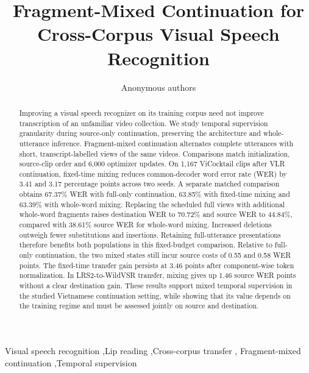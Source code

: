 \documentclass[preprint,review,12pt]{elsarticle}
\begin{document}
\begin{frontmatter}
\title{Fragment-Mixed Continuation for Cross-Corpus Visual Speech Recognition}
\author{Anonymous authors}
\begin{abstract}
Improving a visual speech recognizer on its training corpus need not improve
transcription of an unfamiliar video collection. We study temporal supervision
granularity during source-only continuation, preserving the architecture and
whole-utterance inference. Fragment-mixed continuation alternates complete
utterances with short, transcript-labelled views of the same videos. Comparisons
match initialization, source-clip order and 6,000 optimizer updates. On 1,167
ViCocktail clips after VLR continuation, fixed-time mixing reduces common-decoder
word error rate (WER) by 3.41 and 3.17 percentage points across two seeds.
A separate matched comparison obtains 67.37\% WER with full-only continuation,
63.85\% with fixed-time mixing and 63.39\% with whole-word mixing. Replacing the
scheduled full views with additional whole-word fragments raises destination
WER to 70.72\% and source WER to 44.84\%, compared with 38.61\% source WER for
whole-word mixing. Increased deletions outweigh fewer substitutions and insertions.
Retaining full-utterance presentations therefore benefits both populations in
this fixed-budget comparison. Relative to full-only continuation, the two mixed
states still incur source costs of 0.55 and 0.58 WER points. The fixed-time
transfer gain persists at 3.46 points after component-wise token normalization.
In LRS2-to-WildVSR transfer, mixing gives up 1.46 source WER points without a
clear destination gain. These results support mixed temporal supervision in
the studied Vietnamese continuation setting, while showing that its value depends
on the training regime and must be assessed jointly on source and destination.
\end{abstract}
\begin{keyword}
Visual speech recognition \sep Lip reading \sep Cross-corpus transfer \sep
Fragment-mixed continuation \sep Temporal supervision
\end{keyword}
\end{frontmatter}









\begingroup
{}

\endgroup
\end{document}
